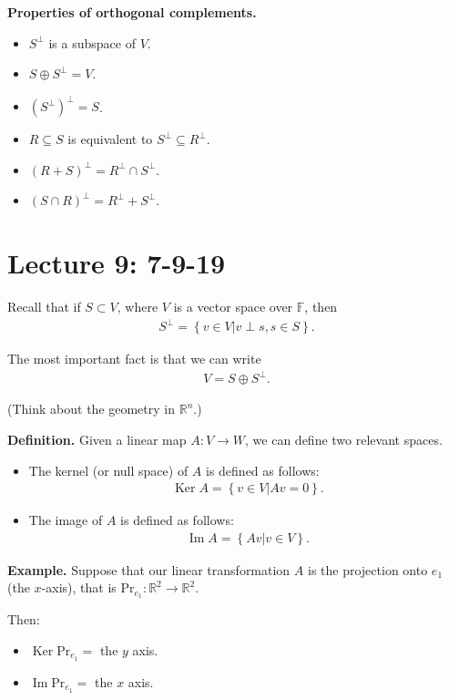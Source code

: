\documentclass{article}
\newcommand{\RR}{\mathbb{R}}
\DeclareMathOperator{\Ker}{Ker}
\DeclareMathOperator{\Ima}{Im}
\DeclareMathOperator{\Ima}{Im}
\begin{document}
{\bf Properties of orthogonal complements.}

\begin{itemize}
  \item $S^{\perp}$ is a subspace of $V$.
  \item $S \oplus S^{\perp} = V$.
  \item $(S^{\perp})^{\perp} = S$.
  \item $R \subseteq S$ is equivalent to $S^{\perp} \subseteq R^{\perp}$.
  \item $(R+S)^{\perp} = R^{\perp} \cap S^{\perp}$.
  \item $(S \cap R)^{\perp} = R^{\perp} + S^{\perp}$.
\end{itemize}

\section{Lecture 9: 7-9-19}

Recall that if $S \subset V$, where $V$ is a vector space over $\mathbb{F}$, then
\begin{align*}
  S^{\perp} = \left\{ v \in V | v \perp s, s \in S \right\}.
\end{align*}

The most important fact is that we can write
\begin{align*}
  V = S \oplus S^{\perp}.
\end{align*}

(Think about the geometry in $\mathbb{R}^n$.)

{\bf Definition.} Given a linear map $A: V \to W$, we can define two relevant spaces.

\begin{itemize}
  \item The kernel (or null space) of $A$ is defined as follows:
    \begin{align*}
      \Ker A = \left\{  v \in V | Av = 0 \right\}.
    \end{align*}
  \item The image of $A$ is defined as follows:
    \begin{align*}
      \Ima A = \left\{ Av | v \in V \right\}.
    \end{align*}
\end{itemize}

{\bf Example.} Suppose that our linear transformation $A$ is the projection onto $e_1$ (the $x$-axis), that is $\text{Pr}_{e_1}: \RR^2 \to \RR^2$.

Then:
\begin{itemize}
  \item $\Ker \text{Pr}_{e_1} = $ the $y$ axis.
  \item $\Ima \text{Pr}_{e_1} = $ the $x$ axis.
\end{itemize}
\end{document}
